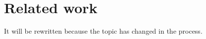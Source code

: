 
\section{Related work} \label{Related_work}

    It will be rewritten because the topic has changed in the process.

\begin{comment}

    In these section we will show related work in context of gradient approximation (one and two points feedback), zero-oracle methods and Frank-Wolfe algorithm.

    \subsection{Gradient approximation}\label{Gradient_approximation}
    
        There are a lot of papers about how to approximate the gradient \cite{ermoliev1976methods, nemirovskij1983problem, agarwal2010optimal, agarwal2011stochastic}. The most popular methods are:
    
        \begin{enumerate}
            \item \textbf{Approximation of the gradient through finite differences (two-point feedback)} \cite{shamir2017optimal, Randomized_gradient_free_methods_in_convex_optimization}. 
    
            In this papers authors used randomized smoothing for the non-smooth objective 
    
            \begin{equation*}
                \label{f_gamma}
                f_{\gamma}(x, \xi) = \mathbb{E}_u\left[f(x + \gamma u, \xi)\right]
            \end{equation*}
    
            where $u \sim RB^d_2(1)$, i.e., $u$ is random vector uniformly distributed on a unit euclidean ball $B_2^d(1)$.
            
            True gradient was estimated by:
    
            \begin{equation}
                \label{nabla(f)_gamma_tpf}
                \nabla f_{\gamma}(x, \xi, e) = d \dfrac{f(x+\gamma e, \xi) - f(x - \gamma e, \xi)}{2 \gamma} e
            \end{equation}
    

\end{comment}
